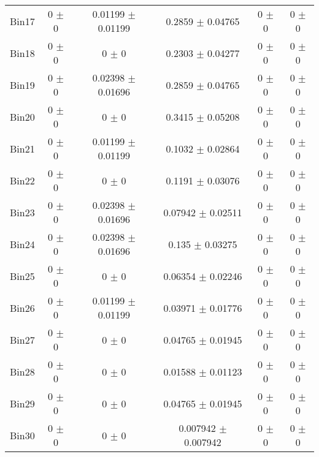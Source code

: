 \begin{tabular}{@{\extracolsep{4pt}}lccccc@{}}
     Bin17 & 0 $\pm$ 0 & 0.01199 $\pm$ 0.01199 & 0.2859 $\pm$ 0.04765 & 0 $\pm$ 0 & 0 $\pm$ 0 \\ 
     Bin18 & 0 $\pm$ 0 & 0 $\pm$ 0 & 0.2303 $\pm$ 0.04277 & 0 $\pm$ 0 & 0 $\pm$ 0 \\ 
     Bin19 & 0 $\pm$ 0 & 0.02398 $\pm$ 0.01696 & 0.2859 $\pm$ 0.04765 & 0 $\pm$ 0 & 0 $\pm$ 0 \\ 
     Bin20 & 0 $\pm$ 0 & 0 $\pm$ 0 & 0.3415 $\pm$ 0.05208 & 0 $\pm$ 0 & 0 $\pm$ 0 \\ 
     Bin21 & 0 $\pm$ 0 & 0.01199 $\pm$ 0.01199 & 0.1032 $\pm$ 0.02864 & 0 $\pm$ 0 & 0 $\pm$ 0 \\ 
     Bin22 & 0 $\pm$ 0 & 0 $\pm$ 0 & 0.1191 $\pm$ 0.03076 & 0 $\pm$ 0 & 0 $\pm$ 0 \\ 
     Bin23 & 0 $\pm$ 0 & 0.02398 $\pm$ 0.01696 & 0.07942 $\pm$ 0.02511 & 0 $\pm$ 0 & 0 $\pm$ 0 \\ 
     Bin24 & 0 $\pm$ 0 & 0.02398 $\pm$ 0.01696 & 0.135 $\pm$ 0.03275 & 0 $\pm$ 0 & 0 $\pm$ 0 \\ 
     Bin25 & 0 $\pm$ 0 & 0 $\pm$ 0 & 0.06354 $\pm$ 0.02246 & 0 $\pm$ 0 & 0 $\pm$ 0 \\ 
     Bin26 & 0 $\pm$ 0 & 0.01199 $\pm$ 0.01199 & 0.03971 $\pm$ 0.01776 & 0 $\pm$ 0 & 0 $\pm$ 0 \\ 
     Bin27 & 0 $\pm$ 0 & 0 $\pm$ 0 & 0.04765 $\pm$ 0.01945 & 0 $\pm$ 0 & 0 $\pm$ 0 \\ 
     Bin28 & 0 $\pm$ 0 & 0 $\pm$ 0 & 0.01588 $\pm$ 0.01123 & 0 $\pm$ 0 & 0 $\pm$ 0 \\ 
     Bin29 & 0 $\pm$ 0 & 0 $\pm$ 0 & 0.04765 $\pm$ 0.01945 & 0 $\pm$ 0 & 0 $\pm$ 0 \\ 
     Bin30 & 0 $\pm$ 0 & 0 $\pm$ 0 & 0.007942 $\pm$ 0.007942 & 0 $\pm$ 0 & 0 $\pm$ 0 \\ 
\hline\hline
  \end{tabular}
